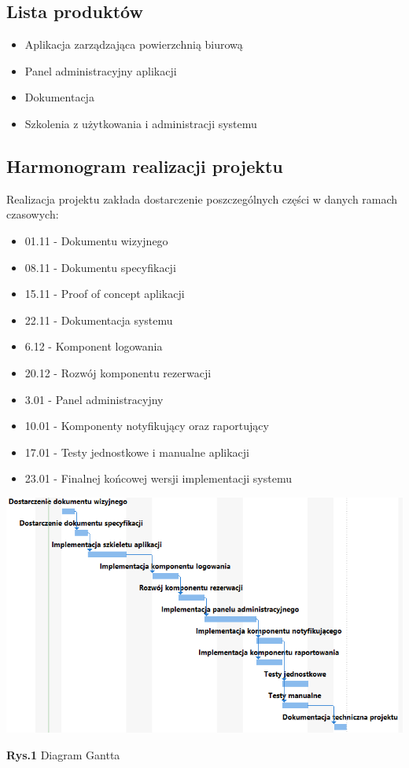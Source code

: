 \documentclass{article}
\begin{document}
\subsection{Lista produktów}
\begin{itemize}
  \item Aplikacja zarządzająca powierzchnią biurową
  \item Panel administracyjny aplikacji
  \item Dokumentacja 
  \item Szkolenia z użytkowania i administracji systemu
\end{itemize}

\subsection{Harmonogram realizacji projektu}
Realizacja projektu zakłada dostarczenie poszczególnych części w danych ramach czasowych:
\begin{itemize}
  \item 01.11 - Dokumentu wizyjnego
  \item 08.11 - Dokumentu specyfikacji
  \item 15.11 - Proof of concept aplikacji
  \item 22.11 - Dokumentacja systemu
  \item 6.12 - Komponent logowania
  \item 20.12 - Rozwój komponentu rezerwacji
  \item 3.01 - Panel administracyjny
  \item 10.01 - Komponenty notyfikujący oraz raportujący
  \item 17.01 - Testy jednostkowe i manualne aplikacji
  \item 23.01 - Finalnej końcowej wersji implementacji systemu
\end{itemize}

\hspace*{-3cm}\includegraphics[scale=0.8]{gant}
\begin{center}\textbf{Rys.1} Diagram Gantta \end{center}
\end{document}
